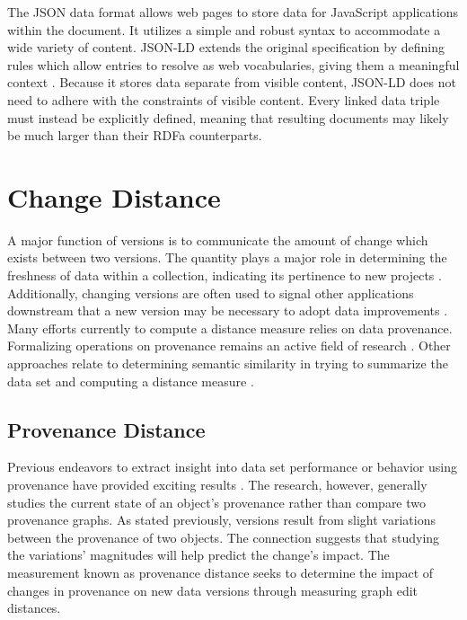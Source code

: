 The JSON data format allows web pages to store data for JavaScript applications within the document.
It utilizes a simple and robust syntax to accommodate a wide variety of content.
JSON-LD extends the original specification by defining rules which allow entries to resolve as web vocabularies, giving them a meaningful context \cite{JSONLD}.
Because it stores data separate from visible content, JSON-LD does not need to adhere with the constraints of visible content.
Every linked data triple must instead be explicitly defined, meaning that resulting documents may likely be much larger than their RDFa counterparts.

\section{Change Distance}

A major function of versions is to communicate the amount of change which exists between two versions.
The quantity plays a major role in determining the freshness of data within a collection, indicating its pertinence to new projects \cite{Bouzeghoub:2004:FAD:1012453.1012464}.
Additionally, changing versions are often used to signal other applications downstream that a new version may be necessary to adopt data improvements \cite{TILMES2011548}.
Many efforts currently to compute a distance measure relies on data provenance.
Formalizing operations on provenance remains an active field of research \cite{Ainy:2015:ASD:2806416.2806429}.
Other approaches relate to determining semantic similarity in trying to summarize the data set and computing a distance measure \cite{Hliaoutakis06informationretrieval}.

\subsection{Provenance Distance}

Previous endeavors to extract insight into data set performance or behavior using provenance have provided exciting results \cite{dai2014provenance}.
The research, however, generally studies the current state of an object's provenance rather than compare two provenance graphs.
As stated previously, versions result from slight variations between the provenance of two objects.
The connection suggests that studying the variations' magnitudes will help predict the change's impact.
The measurement known as provenance distance seeks to determine the impact of changes in provenance on new data versions through measuring graph edit distances.

